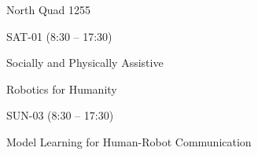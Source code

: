 \documentclass{article}
\begin{document}
\rssheader[2in]

\rssbig
\begin{center}
North Quad 1255
\end{center}

\vfill

\rssmed
\begin{center}
SAT-01 (8:30 -- 17:30)
\end{center}

\rsssm
\begin{center}
Socially and Physically Assistive \par \noindent Robotics for Humanity
\end{center}

\vfill

\rssmed
\begin{center}
SUN-03 (8:30 -- 17:30)
\end{center}

\rsssm
\begin{center}
Model Learning for Human-Robot Communication
\end{center}

\vfill
\end{document}
